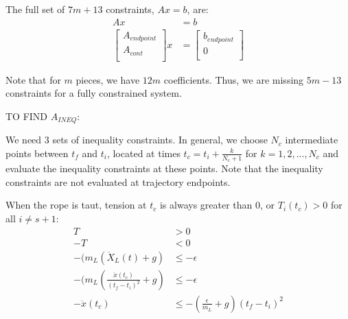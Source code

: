 \documentclass[11pt]{article}
\begin{document}
 
 
 
The full set of $7m+13$ constraints, $Ax = b$, are:
\begin{align}
\nonumber Ax &= b \\
\label{eqn: Akeyframes} 
\begin{bmatrix}
A_{endpoint} \\
A_{cont} \\
 \end{bmatrix}
 x 
& = 
 \begin{bmatrix}
b_{endpoint} \\
0 \\
 \end{bmatrix} 
\end{align}

Note that for $m$ pieces, we have $12m$ coefficients. Thus, we are missing $5m-13$ constraints for a fully constrained system.




\mbox{} \newline
\mbox{} \newline
TO FIND $A_{INEQ}$:
 
We need 3 sets of inequality constraints. In general, we choose $N_c$ intermediate points between $t_f$ and $t_i$, located at times $t_c = t_i+\frac{k}{N_c+1}$ for $k = 1, 2, ..., N_c$ and evaluate the inequality constraints at these points. Note that the inequality constraints are not evaluated at trajectory endpoints. 

\mbox{} \newline
When the rope is taut, tension at $t_c$ is always greater than 0, or $T_i(t_c) > 0$ for all $i \ne s+1$:
\begin{align*}
T &> 0 \\
-T &< 0 \\
-(m_L (\ddot{X}_L(t)+g) &\le -\epsilon \\
-(m_L (\frac{ \ddot{x}(t_c) }{(t_f - t_i)^2}+g) &\le -\epsilon \\
-\ddot{x}(t_c) &\le - (\frac{ \epsilon }{m_L} + g ) (t_f-t_i)^2 \\
\end{align*}
 
\end{document}
